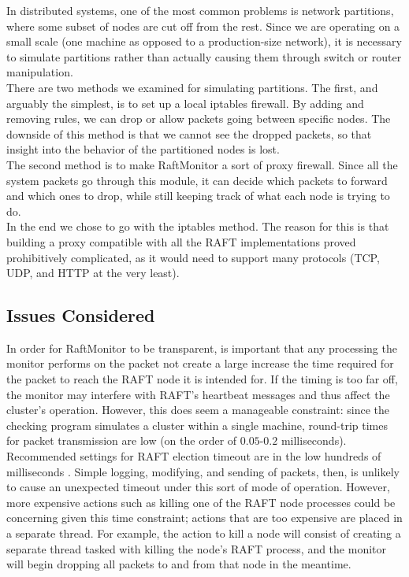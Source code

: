 \documentclass[UTF8]{article}
\begin{document}
In distributed systems, one of the most common problems is network partitions, where some subset of nodes are cut off from the rest. Since we are operating on a small scale (one machine as opposed to a production-size network), it is necessary to simulate partitions rather than actually causing them through switch or router manipulation.
\\ \indent There are two methods we examined for simulating partitions. The first, and arguably the simplest, is to set up a local iptables firewall. By adding and removing rules, we can drop or allow packets going between specific nodes. The downside of this method is that we cannot see the dropped packets, so that insight into the behavior of the partitioned nodes is lost.
\\ \indent The second method is to make RaftMonitor a sort of proxy firewall. Since all the system packets go through this module, it can decide which packets to forward and which ones to drop, while still keeping track of what each node is trying to do.
\\ \indent In the end we chose to go with the iptables method. The reason for this is that building a proxy compatible with all the RAFT implementations proved prohibitively complicated, as it would need to support many protocols (TCP, UDP, and HTTP at the very least). 

\subsection{Issues Considered}

In order for RaftMonitor to be transparent, is important that any processing the monitor performs on the packet not create a large increase the time required for the packet to reach the RAFT node it is intended for. If the timing is too far off, the monitor may interfere with RAFT's heartbeat messages and thus affect the cluster's operation. However, this does seem a manageable constraint: since the checking program simulates a cluster within a single machine, round-trip times for packet transmission are low (on the order of $0.05$-$0.2$ milliseconds). Recommended settings for RAFT election timeout are in the low hundreds of milliseconds \cite{raftPaper}. Simple logging, modifying, and sending of packets, then, is unlikely to cause an unexpected timeout under this sort of mode of operation. However, more expensive actions such as killing one of the RAFT node processes could be concerning given this time constraint; actions that are too expensive are placed in a separate thread. For example, the action to kill a node will consist of creating a separate thread tasked with killing the node's RAFT process, and the monitor will begin dropping all packets to and from that node in the meantime.
\end{document}
